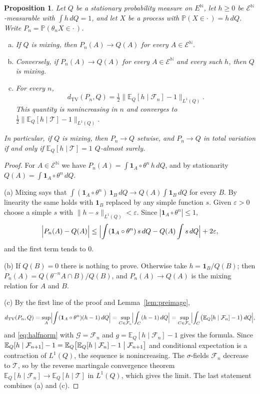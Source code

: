 \documentclass[11pt]{amsart}
\newtheorem{proposition}[theorem]{Proposition}
\theoremstyle{definition}
\theoremstyle{remark}
\newcommand{\N}{\mathbb N}
\newcommand{\E}{\mathbb E}
\newcommand{\Prob}{\mathbb P}
\newcommand{\cE}{\mathcal E}
\newcommand{\cF}{\mathcal F}
\newcommand{\cT}{\mathcal T}
\newcommand{\dtv}{d_{\mathrm{TV}}}
\newcommand{\one}{\mathbf 1}
\begin{document}
\begin{proposition}\label{prop:criterion}
Let $Q$ be a stationary probability measure on $E^\N$, let $h\ge0$ be $\cE^\N$-measurable with $\int h\,dQ=1$, and let
$X$ be a process with $\Prob(X\in\cdot\,)=h\,dQ$. Write $P_n=\Prob(\theta_nX\in\cdot\,)$.
\begin{enumerate}[(a)]
\item If $Q$ is mixing, then $P_n(A)\to Q(A)$ for every $A\in\cE^\N$.
\item Conversely, if $P_n(A)\to Q(A)$ for every $A\in\cE^\N$ and every such $h$, then $Q$ is mixing.
\item For every $n$,
\[
\dtv(P_n,Q)=\tfrac12\bigl\|\E_Q[h\mid\cF_n]-1\bigr\|_{L^1(Q)} .
\]
This quantity is nonincreasing in $n$ and converges to $\frac12\|\E_Q[h\mid\cT]-1\|_{L^1(Q)}$.
\end{enumerate}
In particular, if $Q$ is mixing, then $P_n\to Q$ setwise, and $P_n\to Q$ in total variation if and only if
$\E_Q[h\mid\cT]=1$ $Q$-almost surely.
\end{proposition}

\begin{proof}
For $A\in\cE^\N$ we have $P_n(A)=\int\one_A\circ\theta^n\,h\,dQ$, and by stationarity $Q(A)=\int\one_A\circ\theta^n\,dQ$.

(a) Mixing says that $\int(\one_A\circ\theta^n)\,\one_B\,dQ\to Q(A)\int\one_B\,dQ$ for every $B$. By linearity the same
holds with $\one_B$ replaced by any simple function $s$. Given $\varepsilon>0$ choose a simple $s$ with
$\|h-s\|_{L^1(Q)}<\varepsilon$. Since $|\one_A\circ\theta^n|\le1$,
\[
\Bigl|P_n(A)-Q(A)\Bigr|\le\Bigl|\int(\one_A\circ\theta^n)\,s\,dQ-Q(A)\int s\,dQ\Bigr|+2\varepsilon ,
\]
and the first term tends to $0$.

(b) If $Q(B)=0$ there is nothing to prove. Otherwise take $h=\one_B/Q(B)$; then $P_n(A)=Q(\theta^{-n}A\cap B)/Q(B)$, and
$P_n(A)\to Q(A)$ is the mixing relation for $A$ and $B$.

(c) By the first line of the proof and Lemma~\ref{lem:preimage},
\[
\dtv(P_n,Q)=\sup_{A}\Bigl|\int(\one_A\circ\theta^n)(h-1)\,dQ\Bigr|=\sup_{C\in\cF_n}\Bigl|\int_C(h-1)\,dQ\Bigr|
=\sup_{C\in\cF_n}\Bigl|\int_C\bigl(\E_Q[h\mid\cF_n]-1\bigr)\,dQ\Bigr| ,
\]
and \eqref{eq:halfnorm} with $\mathcal G=\cF_n$ and $g=\E_Q[h\mid\cF_n]-1$ gives the formula. Since
$\E_Q[h\mid\cF_{n+1}]-1=\E_Q\bigl[\E_Q[h\mid\cF_n]-1\bigm|\cF_{n+1}\bigr]$ and conditional expectation is a contraction
of $L^1(Q)$, the sequence is nonincreasing. The $\sigma$-fields $\cF_n$ decrease to $\cT$, so by the reverse martingale
convergence theorem $\E_Q[h\mid\cF_n]\to\E_Q[h\mid\cT]$ in $L^1(Q)$, which gives the limit. The last statement combines
(a) and (c).
\end{proof}
\end{document}
